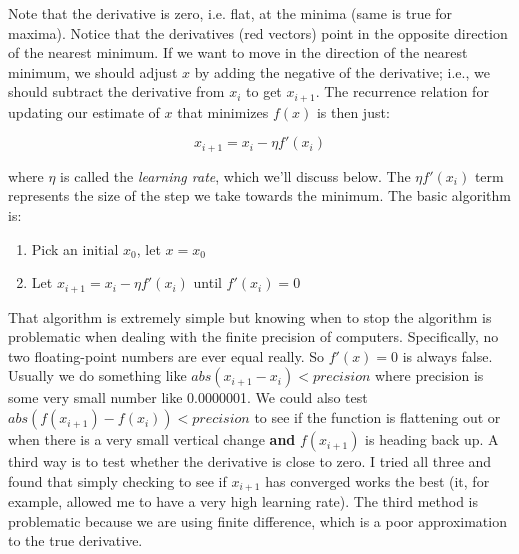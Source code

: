 \documentclass[titlepage]{tufte-book}
\newcounter{problem}
\begin{document}
\begin{fullwidth}
\begin{center}
\end{center}

Note that the derivative is zero, i.e. flat, at the minima (same is true for maxima). Notice that the derivatives (red vectors) point in the opposite direction of the nearest minimum. If we want to move in the direction of the nearest minimum, we should adjust $x$ by adding the negative of the derivative; i.e., we should subtract the derivative from $x_i$ to get $x_{i+1}$.  The recurrence relation for updating our estimate of $x$ that minimizes $f(x)$ is then just:

\[
x_{i+1} = x_i - \eta f'(x_i)
\]

\noindent where $\eta$ is called the {\em learning rate}, which we'll discuss below. The $\eta f'(x_{i})$ term represents the size of the step we take towards the minimum. 
The basic algorithm is:

\begin{enumerate}
\item Pick an initial $x_0$, let $x = x_0$
\item Let $x_{i+1} = x_i - \eta f'(x_i)$ until $f'(x_i)=0$
\end{enumerate}

That algorithm is extremely simple but knowing when to stop the algorithm is problematic when dealing with the finite precision of computers. Specifically, no two floating-point numbers are ever equal really. So $f'(x) = 0$ is always false. Usually we do something like $abs(x_{i+1} - x_i) < precision$ where precision is some very small number like 0.0000001.  We could also test   $abs(f(x_{i+1}) - f(x_i)) < precision$ to see if the function is flattening out or when there is a very small vertical change {\bf and} $f(x_{i+1})$ is heading back up.  A third way is to test whether the derivative is close to zero. I tried all three and found that simply checking to see if $x_{i+1}$ has converged works the best (it, for example, allowed me to have a very high learning rate). The third method is problematic because we are using finite difference, which is a poor approximation to the true derivative.


\end{fullwidth}
\end{document}

